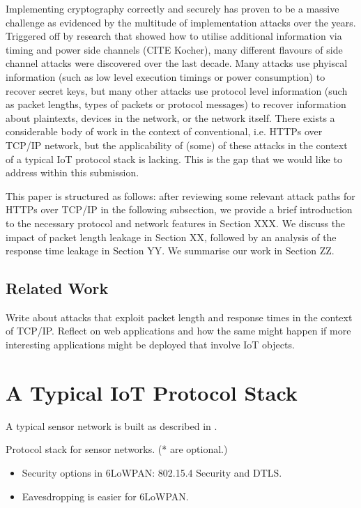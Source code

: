 \documentclass{river-journal}
\begin{document}
Implementing cryptography correctly and securely has proven to be a massive challenge as evidenced by the multitude of implementation attacks over the years. Triggered off by research that showed how to utilise additional information via timing and power side channels (CITE Kocher), many different flavours of side channel attacks were discovered over the last decade. Many attacks use phyiscal information (such as low level execution timings or power consumption) to recover secret keys, but many other attacks use protocol level information (such as packet lengths, types of packets or protocol messages) to recover information about plaintexts, devices in the network, or the network itself. 
There exists a considerable body of work in the context of conventional, i.e. HTTPs over TCP/IP network, but the applicability of (some) of these attacks in the context of a typical IoT protocol stack is lacking. This is the gap that we would like to address within this submission. 

This paper is structured as follows: after reviewing some relevant attack paths for HTTPs over TCP/IP in the following subsection, we provide a brief introduction to the necessary protocol and network features in Section XXX.  We discuss the impact of packet length leakage in Section XX, followed by an analysis of the response time leakage in Section YY. We summarise our work in Section ZZ. 
\subsection{Related Work}

Write about attacks that exploit packet length and response times in the context of TCP/IP. Reflect on web applications and how the same might happen if more interesting applications might be deployed that involve IoT objects.  

\section{A Typical IoT Protocol Stack}
A typical sensor network is built as described in .

\begin{table}[!h]
	\centering
	
	\caption{Protocol stack for sensor networks. (* are optional.)\label{Protocols}}
\end{table}


\begin{itemize}
	\item Security options in 6LoWPAN: 802.15.4 Security and DTLS.
	\item Eavesdropping is easier for 6LoWPAN.
\end{itemize}
\end{document}
